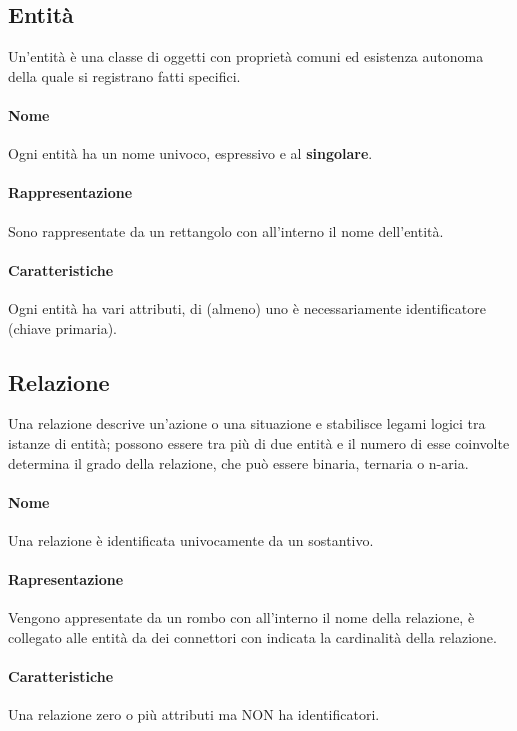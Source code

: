 \documentclass[12pt, a4paper, openany]{book}
\begin{document}
\subsection{Entità}
Un'entità è una classe di oggetti con proprietà comuni ed esistenza autonoma della quale si registrano
fatti specifici.

\paragraph{Nome} Ogni entità ha un nome univoco, espressivo e al \textbf{singolare}.

\paragraph{Rappresentazione} Sono rappresentate da un rettangolo con all'interno il nome dell'entità.

\paragraph{Caratteristiche} Ogni entità ha vari attributi, di (almeno) uno è necessariamente identificatore (chiave primaria).

\subsection{Relazione}
Una relazione descrive un'azione o una situazione e stabilisce legami logici tra istanze di entità; possono essere tra più di due entità e il numero di esse coinvolte determina il grado della relazione, che può essere binaria, ternaria o n-aria.

\paragraph{Nome} Una relazione è identificata univocamente da un sostantivo.

\paragraph{Rapresentazione} Vengono appresentate da un rombo con all'interno il nome della relazione, è collegato alle entità da dei connettori con indicata la cardinalità della relazione.

\paragraph{Caratteristiche} Una relazione zero o più attributi ma NON ha identificatori.
\end{document}
